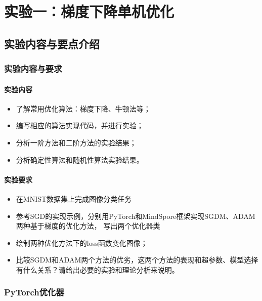 \chapter{实验一：梯度下降单机优化}\label{chapter:task1}

\section{实验内容与要点介绍}

\subsection{实验内容与要求}

\subsubsection{实验内容}
\begin{itemize}
    \item 了解常用优化算法：梯度下降、牛顿法等；
    \item 编写相应的算法实现代码，并进行实验；
    \item 分析一阶方法和二阶方法的实验结果；
    \item 分析确定性算法和随机性算法实验结果。
\end{itemize}

\subsubsection{实验要求}
\begin{itemize}
    \item 在MNIST数据集上完成图像分类任务
    \item 参考SGD的实现示例，分别用PyTorch和MindSpore框架实现SGDM、ADAM两种基于梯度的优化方法， 写出两个优化器类
    \item 绘制两种优化方法下的loss函数变化图像；
    \item 比较SGDM和ADAM两个方法的优劣，这两个方法的表现和超参数、模型选择有什么关系？请给出必要的实验和理论分析来说明。
\end{itemize}

\subsection{PyTorch优化器}

